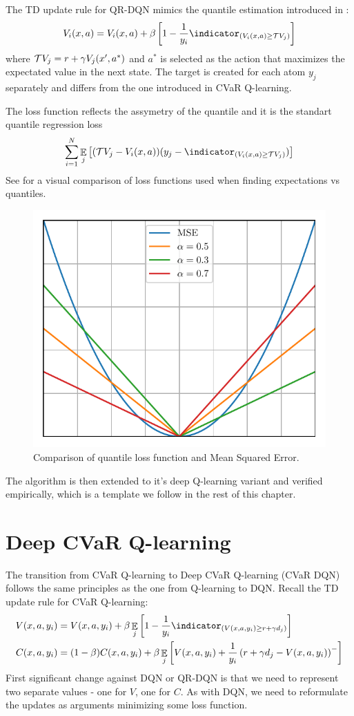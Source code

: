 The TD update rule for QR-DQN mimics the quantile estimation introduced in :
\begin{equation*}
V_i(x, a) = V_i(x, a) + \beta \bsquare{1-\dfrac{1}{y_i}\indicator_{(V_i(x, a) \ge \cT V_j)}}
\end{equation*}
where $\mathcal{T} V_j = r + \gamma V_j(x', a^*)$ and $a^*$ is selected as the action that maximizes the expectated value in the next state. The target is created for each atom $y_j$ separately and differs from the one introduced in CVaR Q-learning.

The loss function reflects the assymetry of the quantile and it is the standart quantile regression loss
\begin{equation}
\sum_{i=1}^{N} \expect_j\bsquare{(\cT V_j - V_i(x, a))(y_j - \indicator_{(V_i(x, a) \ge \cT V_j)})}
\end{equation}
See  for a visual comparison of loss functions used when finding expectations vs quantiles.

\begin{figure}[h]
\center
\includegraphics[width=0.6\linewidth]{gfx/losses.pdf}
\caption{Comparison of quantile loss function and Mean Squared Error.}
\label{fig:losses}
\end{figure}

The algorithm is then extended to it's deep Q-learning variant and verified empirically, which is a template we follow in the rest of this chapter.

\section{Deep CVaR Q-learning}
The transition from CVaR Q-learning to Deep CVaR Q-learning (CVaR DQN) follows the same principles as the one from Q-learning to DQN. Recall the TD update rule for CVaR Q-learning:
\begin{align*}
V(x, a, y_i) &= V(x, a, y_i) + \beta \expect_j\bsquare{1 - \dfrac{1}{y_i}\indicator_{(V(x, a, y_i) \ge r+\gamma d_j)}}\\
C(x, a, y_i) &= (1-\beta)C(x, a, y_i) + \beta\expect_j\bsquare{V(x, a, y_i) + \dfrac{1}{y_i}\bround{r+\gamma d_j - V(x, a, y_i)}^-}
\end{align*}
First significant change against DQN or QR-DQN is that we need to represent two separate values - one for $V$, one for $C$. As with DQN, we need to reformulate the updates as arguments minimizing some loss function.


